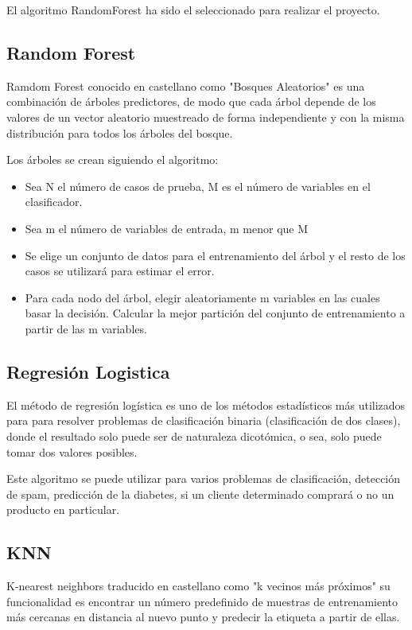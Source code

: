 El algoritmo RandomForest ha sido el seleccionado para realizar el proyecto.

\subsection{Random Forest}

Ramdom Forest conocido en castellano como "Bosques Aleatorios" es una combinación de árboles predictores, de modo que cada árbol depende de los valores de un vector aleatorio muestreado de forma independiente y con la misma distribución para todos los árboles del bosque.

Los árboles se crean siguiendo el algoritmo:


\begin{itemize}
\item Sea N el número de casos de prueba, M es el número de variables en el clasificador.
\item Sea m el número de variables de entrada, m menor que M
\item Se elige un conjunto de datos para el entrenamiento del árbol y el resto de los casos se utilizará para estimar el error.
\item Para cada nodo del árbol, elegir aleatoriamente m variables en las cuales basar la decisión. Calcular la mejor partición del conjunto de entrenamiento a partir de las m variables.
\end{itemize}

\subsection{Regresión Logistica}

El método de regresión logística es uno de los métodos estadísticos más utilizados para para resolver problemas de clasificación binaria (clasificación de dos clases), donde el resultado solo puede ser de naturaleza dicotómica, o sea, solo puede tomar dos valores posibles.

Este algoritmo se puede utilizar para varios problemas de clasificación, detección de spam, predicción de la diabetes, si un cliente determinado comprará o no un producto en particular.

\subsection{KNN}

K-nearest neighbors traducido en castellano como "k vecinos más próximos" su funcionalidad es encontrar un número predefinido de muestras de entrenamiento más cercanas en distancia al nuevo punto y predecir la etiqueta a partir de ellas. 

